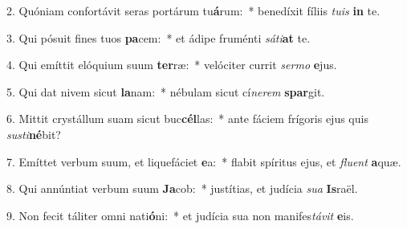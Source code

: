 2. Quóniam confortávit seras portárum tu\textbf{á}rum:~*  benedíxit fíliis \textit{tu}\textit{is} \textbf{in} te.\

3. Qui pósuit fines tuos \textbf{pa}cem:~*  et ádipe fruménti \textit{sá}\textit{ti}\textbf{at} te.\

4. Qui emíttit elóquium suum \textbf{ter}ræ:~*  velóciter currit \textit{ser}\textit{mo} \textbf{e}jus.\

5. Qui dat nivem sicut \textbf{la}nam:~*  nébulam sicut cí\textit{ne}\textit{rem} \textbf{spar}git.\

6. Mittit crystállum suam sicut buc\textbf{cél}las:~*  ante fáciem frígoris ejus quis \textit{sus}\textit{ti}\textbf{né}bit?\

7. Emíttet verbum suum, et liquefáciet \textbf{e}a:~*  flabit spíritus ejus, et \textit{flu}\textit{ent} \textbf{a}quæ.\

8. Qui annúntiat verbum suum \textbf{Ja}cob:~*  justítias, et judícia \textit{su}\textit{a} \textbf{Is}raël.\

9. Non fecit táliter omni nati\textbf{ó}ni:~*  et judícia sua non manifes\textit{tá}\textit{vit} \textbf{e}is.\

